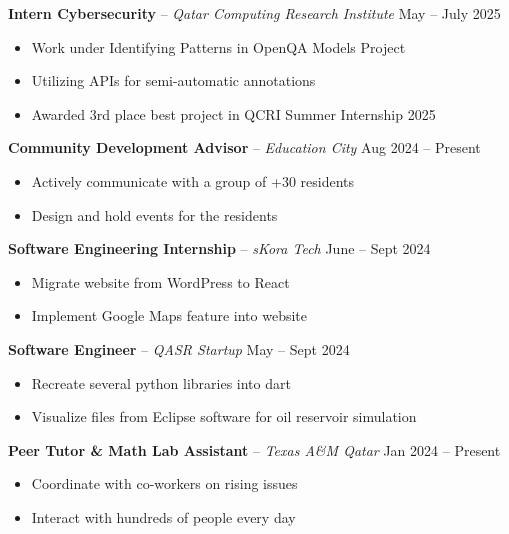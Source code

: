 \documentclass[11pt,a4paper]{article}
\begin{document}
\textbf{Intern Cybersecurity} -- \textit{Qatar Computing Research Institute} \hfill May -- July 2025
\begin{itemize}[leftmargin=2em, nosep, label={}]
    \item Work under Identifying Patterns in OpenQA Models Project
    \item Utilizing APIs for semi-automatic annotations
    \item Awarded 3rd place best project in QCRI Summer Internship 2025
\end{itemize}

\vspace{4pt}

\textbf{Community Development Advisor} -- \textit{Education City} \hfill Aug 2024 -- Present
\begin{itemize}[leftmargin=2em, nosep, label={}]
    \item Actively communicate with a group of +30 residents
    \item Design and hold events for the residents
\end{itemize}

\vspace{4pt}

\textbf{Software Engineering Internship} -- \textit{sKora Tech} \hfill June -- Sept 2024
\begin{itemize}[leftmargin=2em, nosep, label={}]
    \item Migrate website from WordPress to React
    \item Implement Google Maps feature into website
\end{itemize}

\vspace{4pt}

\textbf{Software Engineer} -- \textit{QASR Startup} \hfill May -- Sept 2024
\begin{itemize}[leftmargin=2em, nosep, label={}]
    \item Recreate several python libraries into dart
    \item Visualize files from Eclipse software for oil reservoir simulation
\end{itemize}

\vspace{4pt}

\textbf{Peer Tutor \& Math Lab Assistant} -- \textit{Texas A\&M Qatar} \hfill Jan 2024 -- Present
\begin{itemize}[leftmargin=2em, nosep, label={}]
    \item Coordinate with co-workers on rising issues
    \item Interact with hundreds of people every day
\end{itemize}
\end{document}
